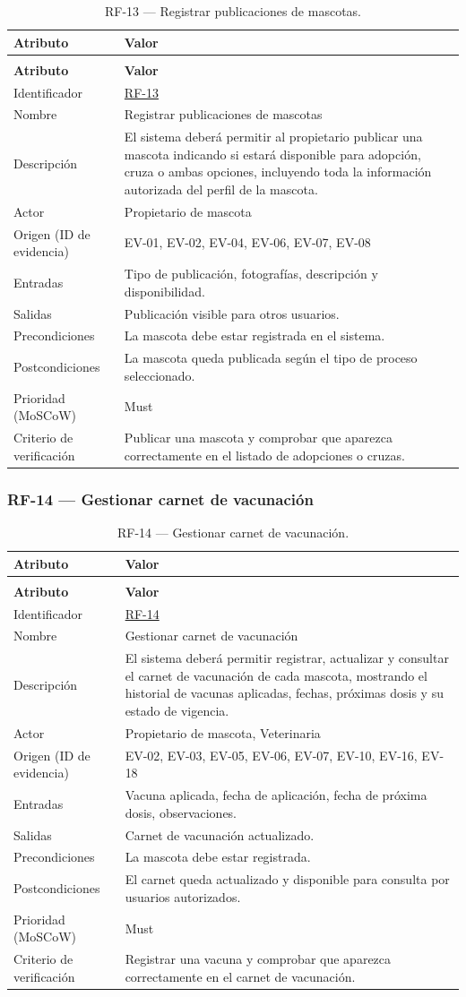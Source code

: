 \documentclass[journal,onecolumn]{IEEEtran}
\makeatletter
\newenvironment{atributos}[2]{%
	\small
	\begin{longtable}{@{}>{\raggedright\arraybackslash}p{4.2cm} >{\raggedright\arraybackslash}p{11.2cm}@{}}
		\caption{#2}\label{tab:#1}\\
		\toprule
		\textbf{Atributo} & \textbf{Valor} \\
		\midrule
		\endfirsthead
		\multicolumn{2}{@{}l}{\small\itshape (continuación)}\\
		\toprule
		\textbf{Atributo} & \textbf{Valor} \\
		\midrule
		\endhead
		\bottomrule
		\endlastfoot
	}{%
	\end{longtable}
	\normalsize
}
\makeatother
\begin{document}
	\begin{atributos}{RF-13}{RF-13 --- Registrar publicaciones de mascotas.}
		Identificador & \hyperref[tab:RF-13]{RF-13} \\
		Nombre & Registrar publicaciones de mascotas \\
		Descripción & El sistema deberá permitir al propietario publicar una mascota indicando si estará disponible para adopción, cruza o ambas opciones, incluyendo toda la información autorizada del perfil de la mascota. \\
		Actor & Propietario de mascota \\
		Origen (ID de evidencia) & EV-01, EV-02, EV-04, EV-06, EV-07, EV-08 \\
		Entradas & Tipo de publicación, fotografías, descripción y disponibilidad. \\
		Salidas & Publicación visible para otros usuarios. \\
		Precondiciones & La mascota debe estar registrada en el sistema. \\
		Postcondiciones & La mascota queda publicada según el tipo de proceso seleccionado. \\
		Prioridad (MoSCoW) & Must \\
		Criterio de verificación & Publicar una mascota y comprobar que aparezca correctamente en el listado de adopciones o cruzas. \\
	\end{atributos}
	
	\subsubsection{RF-14 --- Gestionar carnet de vacunación}
	
	\begin{atributos}{RF-14}{RF-14 --- Gestionar carnet de vacunación.}
		Identificador & \hyperref[tab:RF-14]{RF-14} \\
		Nombre & Gestionar carnet de vacunación \\
		Descripción & El sistema deberá permitir registrar, actualizar y consultar el carnet de vacunación de cada mascota, mostrando el historial de vacunas aplicadas, fechas, próximas dosis y su estado de vigencia. \\
		Actor & Propietario de mascota, Veterinaria \\
		Origen (ID de evidencia) & EV-02, EV-03, EV-05, EV-06, EV-07, EV-10, EV-16, EV-18 \\
		Entradas & Vacuna aplicada, fecha de aplicación, fecha de próxima dosis, observaciones. \\
		Salidas & Carnet de vacunación actualizado. \\
		Precondiciones & La mascota debe estar registrada. \\
		Postcondiciones & El carnet queda actualizado y disponible para consulta por usuarios autorizados. \\
		Prioridad (MoSCoW) & Must \\
		Criterio de verificación & Registrar una vacuna y comprobar que aparezca correctamente en el carnet de vacunación. \\
	\end{atributos}
	
\end{document}
